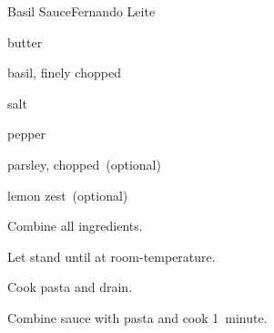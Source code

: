 \begin{recipe}{Basil Sauce}{Fernando Leite}{}

\begin{ingredients}
\item \lbs{\quarter} butter
\item \C{\half} 
\item {} 
\item basil, finely chopped
\item salt
\item pepper
\item parsley, chopped~(optional)
\item lemon zest~(optional)
\end{ingredients}

\begin{directions}
\item Combine all ingredients.
\item Let stand until at room-temperature.
\item Cook pasta and drain.
\item Combine sauce with pasta and cook 1~minute.
\end{directions}

\end{recipe}
